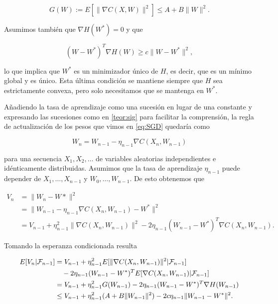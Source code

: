 \begin{equation}
	G(W):= E[ \| \nabla C(X,W)\|^2] \leq A + B\|W\|^2.
\end{equation}

Asumimos también que $\nabla H(W^*)=0$ y que

\begin{equation}
	(W-W^*)^T \nabla H(W) \geq c \|W - W^*\|^2,
\end{equation}

lo que implica que $W^*$ es un minimizador único de $H$, es decir, que es un mínimo global y es único. Esta última condición se mantiene siempre que $H$ sea estrictamente convexa, pero solo necesitamos que se mantenga en $W^*$.

Añadiendo la tasa de aprendizaje como una sucesión en lugar de una constante y expresando las sucesiones como en \ref{teor:sig} para facilitar la comprensión, la regla de actualización de los pesos que vimos en \ref{eq:SGD} quedaría como

\begin{equation}
W_{n} = W_{n-1} - \eta_{n-1} \nabla C(X_n, W_{n-1})
\end{equation} 

para una secuencia $X_1, X_2, \ldots$ de variables aleatorias independientes e idénticamente distribuidas. Asumimos que la tasa de aprendizaje $\eta_{n-1}$ puede depender de $X_1, \ldots, X_{n-1}$ y $W_0, \ldots, W_{n-1}$. De esto obtenemos que 

\begin{align*}
	V_{n} &= \| W_{n} - W* \|^2 \\
	       &= \| W_{n-1} - \eta_{n-1} \nabla C(X_{n}, W_{n-1}) - W^* \|^2 \\
	       &= V_{n-1} + \eta^2_{n-1} \|\nabla C(X_n, W_{n-1}) \|^2 - 2\eta_{n-1}(W_{n-1} - W^*)^T \nabla C(X_n, W_{n-1}).
\end{align*}

Tomando la esperanza condicionada resulta

\begin{align}
	E[V_n | \mathcal{F}_{n-1}] &= V_{n-1} + \eta^2_{n-1} E[ \| \nabla C(X_n, W_{n-1}) \|^2 | \mathcal{F}_{n-1}] \notag \\
	& \quad - 2\eta_{n-1}(W_{n-1} - W^*)^T E[ \nabla C(X_n, W_{n-1}) | \mathcal{F}_{n-1}] \notag \\  
	&= V_{n-1} + \eta^2_{n-1} G(W_{n-1}) - 2 \eta_{n-1}(W_{n-1} - W^*)^T \nabla H(W_{n-1}) \notag \\
	&\leq V_{n-1} + \eta^2_{n-1} (A+B \|W_{n-1} \|^2) - 2c \eta_{n-1} \|W_{n-1} - W^*\|^2. \label{eq:sig1}
\end{align}

